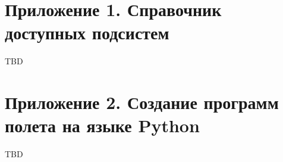 \documentclass[12pt,a4paper]{article}
\begin{document}
\section*{Приложение 1. Справочник доступных подсистем}
\label{Sec:Subsystems}

TBD

\section*{Приложение 2. Создание программ полета на языке Python}
\label{Sec:Python}

TBD
\end{document}
